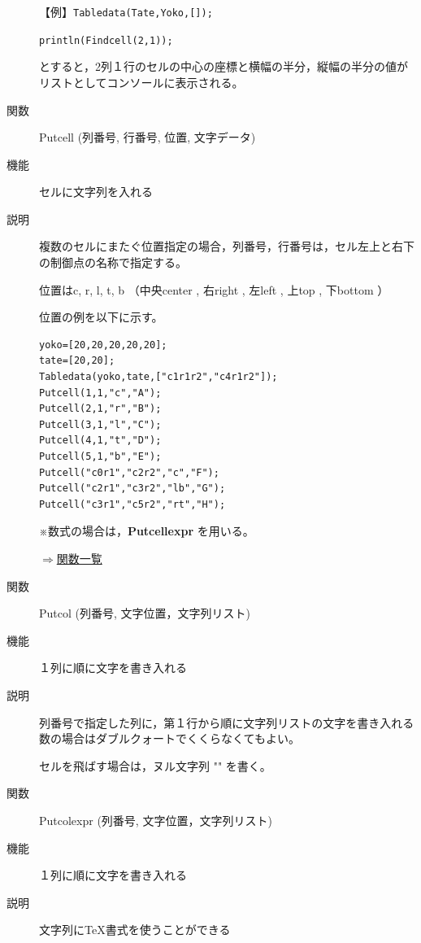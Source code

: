 \documentclass[papersize,a4paper,12pt,uplatex]{jsarticle}
\begin{document}
\begin{description}
\vspace{\baselineskip}
【例】\verb|Tabledata(Tate,Yoko,[]);|

\verb|println(Findcell(2,1));|

とすると，2列１行のセルの中心の座標と横幅の半分，縦幅の半分の値がリストとしてコンソールに表示される。

\vspace{\baselineskip}
\hypertarget{putcell}{}
\item[関数]Putcell (列番号, 行番号, 位置, 文字データ)
\item[機能]セルに文字列を入れる
\item[説明]複数のセルにまたぐ位置指定の場合，列番号，行番号は，セル左上と右下の制御点の名称で指定する。

位置はc, r, l, t, b （中央center , 右right , 左left , 上top , 下bottom ）

位置の例を以下に示す。
\begin{verbatim}
yoko=[20,20,20,20,20];
tate=[20,20];
Tabledata(yoko,tate,["c1r1r2","c4r1r2"]);
Putcell(1,1,"c","A");
Putcell(2,1,"r","B");
Putcell(3,1,"l","C");
Putcell(4,1,"t","D");
Putcell(5,1,"b","E");
Putcell("c0r1","c2r2","c","F");
Putcell("c2r1","c3r2","lb","G");
Putcell("c3r1","c5r2","rt","H");
\end{verbatim}
\vspace{\baselineskip}
\begin{center}  \end{center}

※数式の場合は，{\bf Putcellexpr} を用いる。

\begin{flushright}\hyperlink{functionlist}{$\Rightarrow$関数一覧}\end{flushright}

\vspace{\baselineskip}
\hypertarget{putcol}{}
\item[関数]Putcol (列番号, 文字位置，文字列リスト)
\item[機能]１列に順に文字を書き入れる
\item[説明]列番号で指定した列に，第１行から順に文字列リストの文字を書き入れる\\
数の場合はダブルクォートでくくらなくてもよい。

セルを飛ばす場合は，ヌル文字列 "" を書く。

\vspace{\baselineskip}
\hypertarget{putcolexpr}{}
\item[関数]Putcolexpr (列番号, 文字位置，文字列リスト)
\item[機能]１列に順に文字を書き入れる
\item[説明]文字列に\TeX 書式を使うことができる


\end{description}
\end{document}
